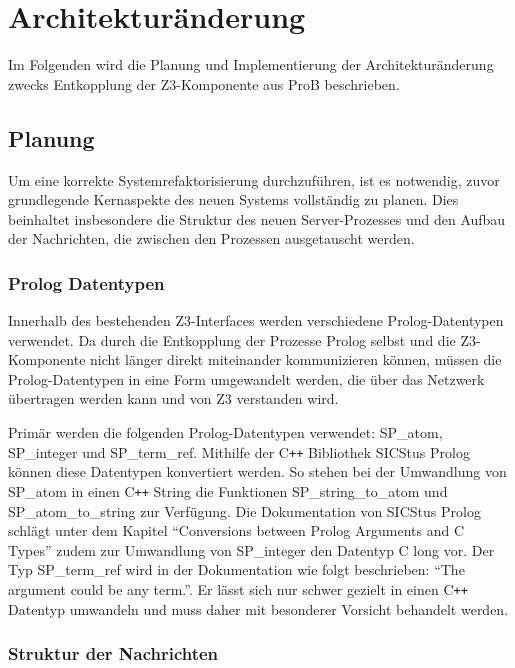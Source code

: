 


\section{Architekturänderung}
Im Folgenden wird die Planung und Implementierung der Architekturänderung zwecks Entkopplung der Z3-Komponente aus ProB beschrieben.

\subsection{Planung}

Um eine korrekte Systemrefaktorisierung durchzuführen, ist es notwendig, zuvor grundlegende Kernaspekte
des neuen Systems vollständig zu planen. Dies beinhaltet insbesondere die Struktur des neuen Server-Prozesses
und den Aufbau der Nachrichten, die zwischen den Prozessen ausgetauscht werden.

\subsubsection{Prolog Datentypen}

Innerhalb des bestehenden Z3-Interfaces werden verschiedene Prolog-Datentypen verwendet.
Da durch die Entkopplung der Prozesse Prolog selbst und die Z3-Komponente nicht länger direkt miteinander kommunizieren können,
müssen die Prolog-Datentypen in eine Form umgewandelt werden, die über das Netzwerk übertragen werden kann und von Z3 verstanden wird.

Primär werden die folgenden Prolog-Datentypen verwendet: SP\_atom, SP\_integer und SP\_term\_ref.
Mithilfe der C\texttt{++} Bibliothek SICStus Prolog können diese Datentypen konvertiert werden.
So stehen bei der Umwandlung von SP\_atom in einen C\texttt{++} String die Funktionen SP\_string\_to\_atom und SP\_atom\_to\_string zur Verfügung.
Die Dokumentation von SICStus Prolog \cite{sicstusdoc} schlägt unter dem Kapitel \enquote{Conversions between Prolog Arguments and C Types} zudem zur Umwandlung von SP\_integer den Datentyp C long vor.
Der Typ SP\_term\_ref wird in der Dokumentation wie folgt beschrieben: \enquote{The argument could be any term.}.
Er lässt sich nur schwer gezielt in einen C\texttt{++} Datentyp umwandeln und muss daher mit besonderer Vorsicht behandelt werden.

\subsubsection{Struktur der Nachrichten}

